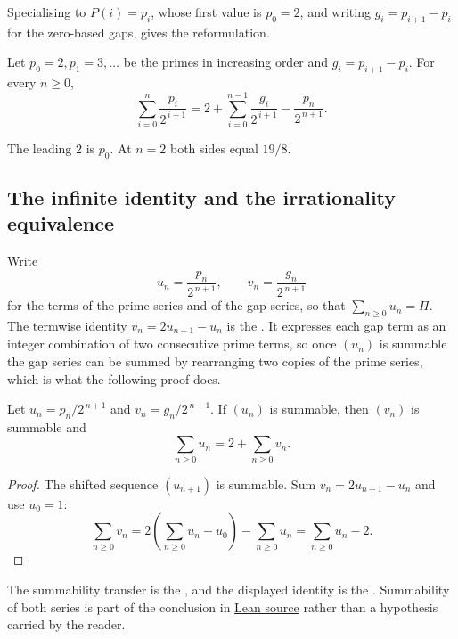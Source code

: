 \documentclass[11pt]{article}
\begin{document}
Specialising to $P(i)=p_i$, whose first value is $p_0=2$, and writing
$g_i=p_{i+1}-p_i$ for the zero-based gaps, gives the reformulation.

\begin{theorem}\label{res:parts}
Let $p_0=2,p_1=3,\ldots$ be the primes in increasing order and
$g_i=p_{i+1}-p_i$.  For every $n\ge0$,
\[
 \sum_{i=0}^{n}\frac{p_i}{2^{\,i+1}}
 =2+\sum_{i=0}^{n-1}\frac{g_i}{2^{\,i+1}}-\frac{p_n}{2^{\,n+1}} .
\]
\end{theorem}

The leading $2$ is $p_0$.  At $n=2$ both sides equal $19/8$.

\subsection{The infinite identity and the irrationality equivalence}\label{sec:infinite}

Write
\[
 u_n=\frac{p_n}{2^{\,n+1}},\qquad
 v_n=\frac{g_n}{2^{\,n+1}}
\]
for the terms of the prime series and of the gap series, so that
$\sum_{n\ge0}u_n=\Pi$.  The termwise identity $v_n=2u_{n+1}-u_n$ is the
.  It expresses each gap term as an integer combination of
two consecutive prime terms, so once $(u_n)$ is summable the gap series can be
summed by rearranging two copies of the prime series, which is what the
following proof does.

\begin{theorem}\label{res:infinite}
Let $u_n=p_n/2^{\,n+1}$ and $v_n=g_n/2^{\,n+1}$.  If $(u_n)$ is summable, then
$(v_n)$ is summable and
\[
 \sum_{n\ge0}u_n=2+\sum_{n\ge0}v_n .
\]
\end{theorem}

\begin{proof}
The shifted sequence $(u_{n+1})$ is summable.  Sum
$v_n=2u_{n+1}-u_n$ and use $u_0=1$:
\[
 \sum_{n\ge0}v_n
 =2\left(\sum_{n\ge0}u_n-u_0\right)-\sum_{n\ge0}u_n
 =\sum_{n\ge0}u_n-2 .
\]
\end{proof}

\noindent The summability transfer is the
, and the displayed identity is the
.  Summability of both series is part of the conclusion in
\href{https://github.com/wcook04/plectis-erdos/blob/f36a98bf3d3e6f65f1074e3b800e3293d5b8a51a/ErdosProblems/Erdos251/PaperCoreR7.lean#L47}{Lean source} rather than a hypothesis carried by the
reader.
\end{document}
